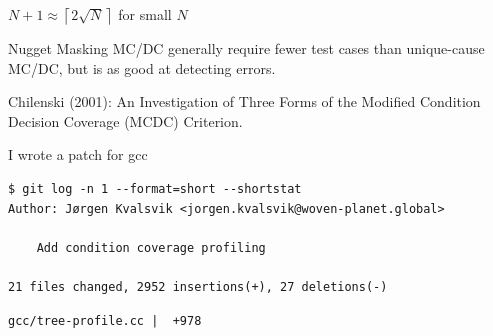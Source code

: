 \documentclass[xcolor = {dvipsnames, table}, aspectratio=169]{beamer}
\begin{document}
\begin{frame}
    \centering


    \pause
    \begin{block}{}
        $N+1 \approx \left \lceil {2\sqrt{N}} \right \rceil$ for small $N$
    \end{block}

\end{frame}

\begin{frame}
    \begin{block}{Nugget}
        Masking MC/DC generally require fewer test cases than unique-cause MC/DC,
        but is as good at detecting errors.
    \end{block}

    \begin{block}{}
        \small{
            Chilenski (2001): An Investigation of Three Forms of the Modified
            Condition Decision Coverage (MCDC) Criterion.
        }
    \end{block}
\end{frame}

\begin{frame}[fragile]
    I wrote a patch for gcc

    \begin{block}{}
        \begin{Verbatim}[fontsize = \footnotesize]
$ git log -n 1 --format=short --shortstat
Author: Jørgen Kvalsvik <jorgen.kvalsvik@woven-planet.global>

    Add condition coverage profiling

21 files changed, 2952 insertions(+), 27 deletions(-)
        \end{Verbatim}
    \end{block}

    \begin{block}{}
        \begin{Verbatim}[fontsize=\footnotesize]
 gcc/tree-profile.cc |  +978
        \end{Verbatim}
    \end{block}
\end{frame}
\end{document}
